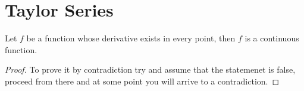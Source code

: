\section{Taylor Series}


\begin{theorem}
    Let $f$ be a function whose derivative exists in every point, then $f$
    is a continuous function.
\end{theorem}

\begin{proof}
    To prove it by contradiction try and assume that the statemenet is false,
    proceed from there and at some point you will arrive to a contradiction.
\end{proof}
